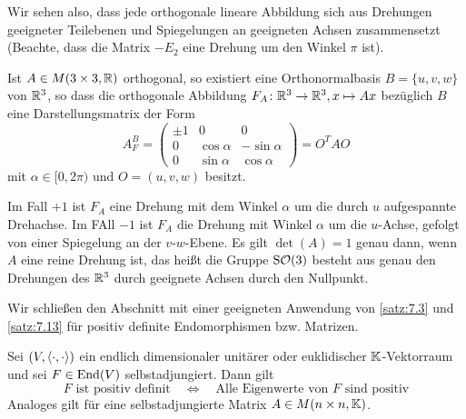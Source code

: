 Wir sehen also, dass jede orthogonale lineare Abbildung sich aus Drehungen geeigneter Teilebenen und Spiegelungen an geeigneten Achsen zusammensetzt (Beachte, dass die Matrix $-E_2$ eine Drehung um den Winkel $\pi$ ist).
\newpage
\begin{anwendung}[Der Fall $n=3$]
	\label{anw:7.18}
	Ist $A \in M(3 \times 3,\mathbb{R})$ orthogonal, so existiert eine Orthonormalbasis $B = \{u,v,w\}$ von $\mathbb{R}^3$, so dass die orthogonale Abbildung $F_A \colon \mathbb{R}^3 \rightarrow \mathbb{R}^3, x \mapsto Ax$ bezüglich $B$ eine Darstellungsmatrix der Form
	\[
		A_F^B = \begin{pmatrix}
			\pm 1 & 0 & 0 \\
		0 & \cos \alpha & -\sin \alpha \\
		0 & \sin \alpha & \cos \alpha
		\end{pmatrix} = O^T A O
	\]
	mit $\alpha \in [0,2\pi)$ und $O = (u,v,w)$ besitzt.
	
	Im Fall $+1$ ist $F_A$ eine Drehung mit dem Winkel $\alpha$ um die durch $u$ aufgespannte Drehachse.
	Im FAll $-1$ ist $F_A$ die Drehung mit Winkel $\alpha$ um die $u$-Achse, gefolgt von einer Spiegelung an der $v$-$w$-Ebene.
	Es gilt $\det(A) = 1$ genau dann, wenn $A$ eine reine Drehung ist, das heißt die Gruppe $\operatorname{S\mathcal{O}}(3)$ besteht aus genau den Drehungen des $\mathbb{R}^3$ durch geeignete Achsen durch den Nullpunkt.
\end{anwendung}

Wir schließen den Abschnitt mit einer geeigneten Anwendung von \autoref{satz:7.3} und \autoref{satz:7.13} für positiv definite Endomorphismen bzw. Matrizen.

\begin{satz}
	\label{satz:7.19}
	Sei $(V,\left\langle\cdot,\cdot\right\rangle)$ ein endlich dimensionaler unitärer oder euklidischer $\mathbb{K}$-Vektorraum und sei $F \in \operatorname{End}(V)$ selbstadjungiert.
	Dann gilt
	\[
		F \text{ ist positiv definit} \quad \iff \quad \text{Alle Eigenwerte von } F \text{ sind positiv}
	\]
	Analoges gilt für eine selbstadjungierte Matrix $A \in M(n \times n, \mathbb{K})$.
\end{satz}

